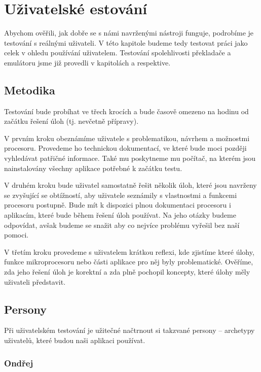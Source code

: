 \chapter{Uživatelské estování}

Abychom ověřili, jak dobře se s námi navrženými nástroji funguje, podrobíme je testování s reálnými uživateli. V této kapitole budeme tedy testovat práci jako celek v ohledu používání uživatelem. Testování spolehlivosti překladače a emulátoru jsme již provedli v kapitolách  a  respektive.

\section{Metodika}

Testování bude probíhat ve třech krocích a bude časově omezeno na hodinu od začátku řešení úloh (tj. nevčetně přípravy).

V prvním kroku obeznámíme uživatele s problematikou, návrhem a možnostmi procesoru. Provedeme ho technickou dokumentací, ve které bude moci později vyhledávat patřičné informace. Také mu poskytneme mu počítač, na kterém jsou nainstalovány všechny aplikace potřebné k začátku testu.

V druhém kroku bude uživatel samostatně řešit několik úloh, které jsou navrženy se zvyšující se obtížností, aby uživatele seznámily s vlastnostmi a funkcemi procesoru postupně. Bude mít k dispozici plnou dokumentaci procesoru i aplikacím, které bude během řešení úloh používat. Na jeho otázky budeme odpovídat, avšak budeme se snažit aby co nejvíce problému vyřešil bez naší pomoci.

V třetím kroku provedeme s uživatelem krátkou reflexi, kde zjistíme které úlohy, funkce mikroprocesoru nebo části aplikace pro něj byly problematické. Ověříme, zda jeho řešení úloh je korektní a zda plně pochopil koncepty, které úlohy měly uživateli představit.

\section{Persony}

Při uživatelském testování je užitečné načtrnout si takzvané persony -- archetypy uživatelů, které budou naši aplikaci používat.

\subsection{Ondřej}
\label{persona:a}

